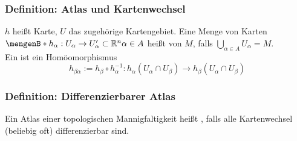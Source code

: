 \subsubsection{Definition: Atlas und Kartenwechsel}
$h$ heißt Karte, $U$ das zugehörige Kartengebiet. Eine Menge von Karten $\set[h_\alpha : U_\alpha \to U'_\alpha \subset \mathds{R}^n]{\alpha \in A} $ heißt  von
$M$, falls $\bigcup_{\alpha \in A} U_\alpha = M$.\\
Ein  ist ein Homöomorphismus 
\[
	h_{\beta \alpha} := h_\beta \circ  h_\alpha ^{-1} : h_\alpha(U_\alpha \cap U_\beta) \to h_\beta( U_\alpha \cap U_\beta)  
\]

\subsubsection{Definition: Differenzierbarer Atlas} %
\label{ssub:123}
Ein Atlas einer topologischen Mannigfaltigkeit heißt , falls  alle Kartenwechsel (beliebig oft) differenzierbar sind.

